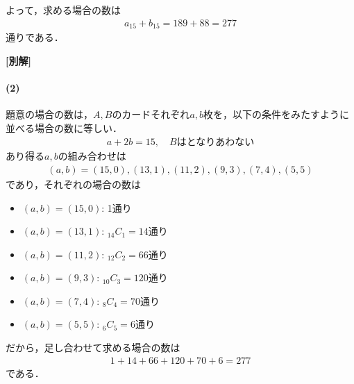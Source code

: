 \documentclass[../../main.tex]{subfiles}
\begin{document}
よって，求める場合の数は
\begin{align}
  a_{15}+b_{15} = 189+88=277
\end{align}
通りである．

{\bf [別解]}

\paragraph{(2)}

題意の場合の数は，$A,B$のカードそれぞれ$a,b$枚を，以下の条件をみたすように並べる場合の数に等しい．
\begin{align}
  a+2b=15, \quad B\text{はとなりあわない}
\end{align}
あり得る$a,b$の組み合わせは
\begin{align}
  (a,b)=(15,0),(13,1),(11,2),(9,3),(7,4),(5,5)
\end{align}
であり，それぞれの場合の数は
\begin{itemize}
  \item $(a,b)=(15,0)$: 1通り \\
  \item $(a,b)=(13,1)$: ${}_{14}C_1=14$通り \\
  \item $(a,b)=(11,2)$: ${}_{12}C_{2}=66$通り \\
  \item $(a,b)=(9,3)$:  ${}_{10}C_3=120$通り \\
  \item $(a,b)=(7,4)$:  ${}_8C_4=70$通り \\
  \item $(a,b)=(5,5)$:  ${}_6C_5=6$通り
\end{itemize}
だから，足し合わせて求める場合の数は
\begin{align}
  1+14+66+120+70+6=277
\end{align}
である．
\end{document}
